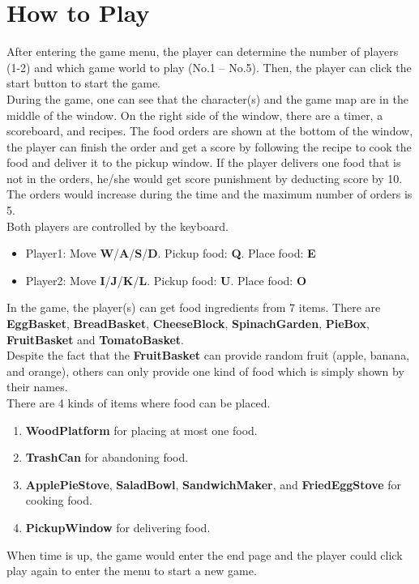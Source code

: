 \section{How to Play}
After entering the game menu, the player can determine the number of players (1-2) and which game world to play (No.1 – No.5). Then, the player can click the start button to start the game.\\
During the game, one can see that the character(s) and the game map are in the middle of the window. On the right side of the window, there are a timer, a scoreboard, and recipes. The food orders are shown at the bottom of the window, the player can finish the order and get a score by following the recipe to cook the food and deliver it to the pickup window. If the player delivers one food that is not in the orders, he/she would get score punishment by deducting score by 10. The orders would increase during the time and the maximum number of orders is 5.\\
Both players are controlled by the keyboard.
\begin{itemize}
    \item Player1: Move \textbf{W}/\textbf{A}/\textbf{S}/\textbf{D}. Pickup food: \textbf{Q}. Place food: \textbf{E}
    \item Player2: Move \textbf{I}/\textbf{J}/\textbf{K}/\textbf{L}. Pickup food: \textbf{U}. Place food: \textbf{O}
\end{itemize}


In the game, the player(s) can get food ingredients from 7 items. There are \textbf{EggBasket}, \textbf{BreadBasket}, \textbf{CheeseBlock}, \textbf{SpinachGarden}, \textbf{PieBox}, \textbf{FruitBasket} and \textbf{TomatoBasket}.\\
Despite the fact that the \textbf{FruitBasket} can provide random fruit (apple, banana, and orange), others can only provide one kind of food which is simply shown by their names.\\
There are 4 kinds of items where food can be placed.
\begin{enumerate}
	\item \textbf{WoodPlatform} for placing at most one food.
    \item \textbf{TrashCan} for abandoning food.
    \item \textbf{ApplePieStove}, \textbf{SaladBowl}, \textbf{SandwichMaker}, and \textbf{FriedEggStove} for cooking food.
    \item \textbf{PickupWindow} for delivering food.
\end{enumerate}
When time is up, the game would enter the end page and the player could click play again to enter the menu to start a new game.\\
\quad \\
